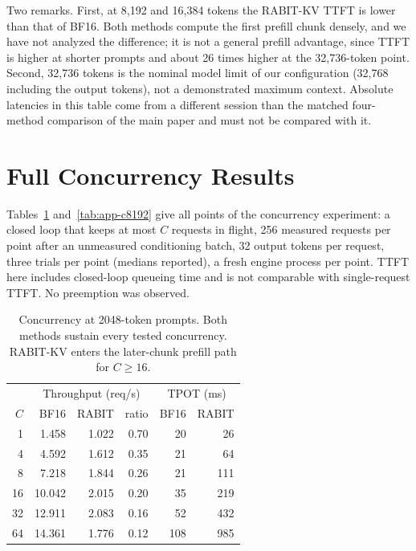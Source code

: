 \documentclass{article}
\begin{document}
Two remarks. First, at 8,192 and 16,384 tokens the RABIT-KV TTFT is lower than that of BF16. Both
methods compute the first prefill chunk densely, and we have not analyzed the difference; it is not a
general prefill advantage, since TTFT is higher at shorter prompts and about 26 times higher at the
32,736-token point. Second, 32,736 tokens is the nominal model limit of our configuration (32,768
including the output tokens), not a demonstrated maximum context. Absolute latencies in this table come
from a different session than the matched four-method comparison of the main paper and must not be
compared with it.

\section{Full Concurrency Results}
\label{app:concurrency}

Tables~\ref{tab:app-c2048} and~\ref{tab:app-c8192} give all points of the concurrency experiment: a
closed loop that keeps at most $C$ requests in flight, 256 measured requests per point after an
unmeasured conditioning batch, 32 output tokens per request, three trials per point (medians reported),
a fresh engine process per point. TTFT here includes closed-loop queueing time and is not comparable
with single-request TTFT. No preemption was observed.

\begin{table}[h]
\centering
\small
\setlength{\tabcolsep}{3.5pt}
\begin{tabular}{@{}rrrrrr@{}}
\toprule
 & \multicolumn{3}{c}{Throughput (req/s)} & \multicolumn{2}{c}{TPOT (ms)} \\
$C$ & BF16 & RABIT & ratio & BF16 & RABIT \\
\midrule
1 & 1.458 & 1.022 & 0.70 & 20 & 26 \\
4 & 4.592 & 1.612 & 0.35 & 21 & 64 \\
8 & 7.218 & 1.844 & 0.26 & 21 & 111 \\
16 & 10.042 & 2.015 & 0.20 & 35 & 219 \\
32 & 12.911 & 2.083 & 0.16 & 52 & 432 \\
64 & 14.361 & 1.776 & 0.12 & 108 & 985 \\
\bottomrule
\end{tabular}
\caption{Concurrency at 2048-token prompts. Both methods sustain every tested concurrency. RABIT-KV
enters the later-chunk prefill path for $C \ge 16$.}
\label{tab:app-c2048}
\end{table}
\end{document}
